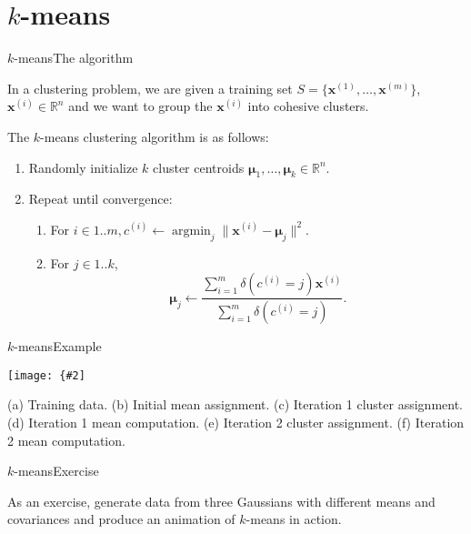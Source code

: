 \documentclass{beamer}
\renewcommand{\vec}[1]{\boldsymbol{#1}}
\def\Rset{\mathbb{R}}
\DeclareMathOperator*{\argmin}{argmin}
\newcommand{\myfig}[3]{\centerline{\texttt{[image: \{\#2]}}}
    \centerline{\scriptsize #3}}
\begin{document}
\section{$k$-means}

\begin{frame}{$k$-means}{The algorithm}

  In a \alert{clustering} problem, we are given a training set
  $S = \{ \vec{x}^{(1)}, \ldots, \vec{x}^{(m)} \}$, $\vec{x}^{(i)} \in \Rset^n$
  and we want to
  group the $\vec{x}^{(i)}$ into cohesive clusters.

  \medskip

  The \alert{$k$-means} clustering algorithm is as follows:
  \begin{enumerate}
  \item Randomly initialize $k$ \alert{cluster centroids} $\vec{\mu}_1,\ldots,\vec{\mu}_k \in \Rset^n$.
  \item Repeat until convergence:
    \begin{enumerate}
    \item For $i \in 1..m, c^{(i)} \leftarrow \argmin_j \| \vec{x}^{(i)} - \vec{\mu}_j \|^2$.
    \item For $j \in 1..k$,
      \[ \vec{\mu}_j \leftarrow \frac{\sum_{i=1}^m \delta(c^{(i)}=j)\vec{x}^{(i)}}{\sum_{i=1}^m \delta(c^{(i)}=j)}. \]
    \end{enumerate}
    
  \end{enumerate}
    
\end{frame}


\begin{frame}{$k$-means}{Example}

  \myfig{3.2in}{kmeans}{Ng (2017), CS229 lecture notes}

  \medskip

  (a) Training data. (b) Initial mean assignment.
  (c) Iteration 1 cluster assignment. (d) Iteration 1 mean computation.
  (e) Iteration 2 cluster assignment. (f) Iteration 2 mean computation.

\end{frame}


\begin{frame}{$k$-means}{Exercise}

  As an exercise, generate data from three Gaussians with different
  means and covariances and produce an animation of $k$-means in
  action.

\end{frame}
\end{document}
